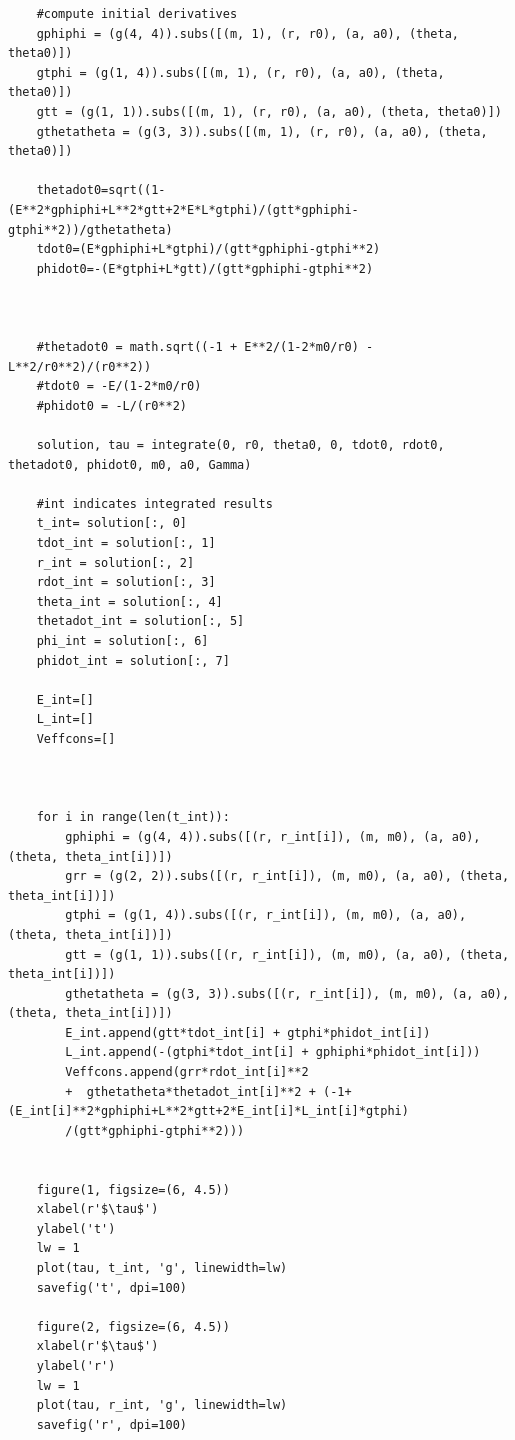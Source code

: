 \documentclass[10pt,a4paper]{report}
\begin{document}
\begin{verbatim}
    #compute initial derivatives
    gphiphi = (g(4, 4)).subs([(m, 1), (r, r0), (a, a0), (theta, theta0)])
    gtphi = (g(1, 4)).subs([(m, 1), (r, r0), (a, a0), (theta, theta0)])
    gtt = (g(1, 1)).subs([(m, 1), (r, r0), (a, a0), (theta, theta0)])
    gthetatheta = (g(3, 3)).subs([(m, 1), (r, r0), (a, a0), (theta, theta0)])

    thetadot0=sqrt((1-(E**2*gphiphi+L**2*gtt+2*E*L*gtphi)/(gtt*gphiphi-gtphi**2))/gthetatheta)
    tdot0=(E*gphiphi+L*gtphi)/(gtt*gphiphi-gtphi**2)
    phidot0=-(E*gtphi+L*gtt)/(gtt*gphiphi-gtphi**2)



    #thetadot0 = math.sqrt((-1 + E**2/(1-2*m0/r0) - L**2/r0**2)/(r0**2))
    #tdot0 = -E/(1-2*m0/r0)
    #phidot0 = -L/(r0**2)

    solution, tau = integrate(0, r0, theta0, 0, tdot0, rdot0, thetadot0, phidot0, m0, a0, Gamma)

    #int indicates integrated results
    t_int= solution[:, 0]
    tdot_int = solution[:, 1]
    r_int = solution[:, 2]
    rdot_int = solution[:, 3]
    theta_int = solution[:, 4]
    thetadot_int = solution[:, 5]
    phi_int = solution[:, 6]
    phidot_int = solution[:, 7]

    E_int=[]
    L_int=[]
    Veffcons=[]



    for i in range(len(t_int)):
        gphiphi = (g(4, 4)).subs([(r, r_int[i]), (m, m0), (a, a0), (theta, theta_int[i])])
        grr = (g(2, 2)).subs([(r, r_int[i]), (m, m0), (a, a0), (theta, theta_int[i])])
        gtphi = (g(1, 4)).subs([(r, r_int[i]), (m, m0), (a, a0), (theta, theta_int[i])])
        gtt = (g(1, 1)).subs([(r, r_int[i]), (m, m0), (a, a0), (theta, theta_int[i])])
        gthetatheta = (g(3, 3)).subs([(r, r_int[i]), (m, m0), (a, a0), (theta, theta_int[i])])
        E_int.append(gtt*tdot_int[i] + gtphi*phidot_int[i])
        L_int.append(-(gtphi*tdot_int[i] + gphiphi*phidot_int[i]))
        Veffcons.append(grr*rdot_int[i]**2 
        +  gthetatheta*thetadot_int[i]**2 + (-1+(E_int[i]**2*gphiphi+L**2*gtt+2*E_int[i]*L_int[i]*gtphi)
        /(gtt*gphiphi-gtphi**2)))


    figure(1, figsize=(6, 4.5))
    xlabel(r'$\tau$')
    ylabel('t')
    lw = 1
    plot(tau, t_int, 'g', linewidth=lw)
    savefig('t', dpi=100)

    figure(2, figsize=(6, 4.5))
    xlabel(r'$\tau$')
    ylabel('r')
    lw = 1
    plot(tau, r_int, 'g', linewidth=lw)
    savefig('r', dpi=100)


\end{verbatim}
\end{document}
